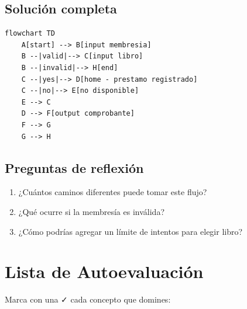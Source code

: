 \documentclass[12pt]{article}
\begin{document}
\subsection{Solución completa}

\begin{lstlisting}[style=mermaidstyle]
flowchart TD
    A[start] --> B[input membresia]
    B --|valid|--> C[input libro]
    B --|invalid|--> H[end]
    C --|yes|--> D[home - prestamo registrado]
    C --|no|--> E[no disponible]
    E --> C
    D --> F[output comprobante]
    F --> G
    G --> H
\end{lstlisting}

\subsection{Preguntas de reflexión}

\begin{enumerate}
    \item ¿Cuántos caminos diferentes puede tomar este flujo?
    \item ¿Qué ocurre si la membresía es inválida?
    \item ¿Cómo podrías agregar un límite de intentos para elegir libro?
\end{enumerate}

\newpage

\section{Lista de Autoevaluación}

Marca con una ✓ cada concepto que domines:
\end{document}
